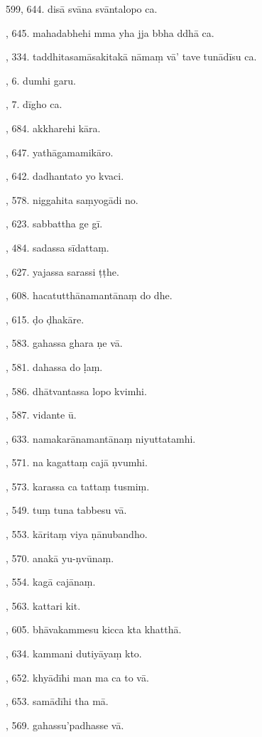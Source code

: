 599, 644. disā svāna svāntalopo ca.\par {}, 645. mahadabhehi mma yha jja bbha ddhā ca.\par {}, 334. taddhitasamāsakitakā nāmaṃ vā’ tave tunādīsu ca.\par {}, 6. dumhi garu.\par {}, 7. dīgho ca.\par {}, 684. akkharehi kāra.\par {}, 647. yathāgamamikāro.\par {}, 642. dadhantato yo kvaci.\par {}, 578. niggahita saṃyogādi no.\par {}, 623. sabbattha ge gī.\par {}, 484. sadassa sīdattaṃ.\par {}, 627. yajassa sarassi ṭṭhe.\par {}, 608. hacatutthānamantānaṃ do dhe.\par {}, 615. ḍo ḍhakāre.\par {}, 583. gahassa ghara ṇe vā.\par {}, 581. dahassa do ḷaṃ.\par {}, 586. dhātvantassa lopo kvimhi.\par {}, 587. vidante ū.\par {}, 633. namakarānamantānaṃ niyuttatamhi.\par {}, 571. na kagattaṃ cajā ṇvumhi.\par {}, 573. karassa ca tattaṃ tusmiṃ.\par {}, 549. tuṃ tuna tabbesu vā.\par {}, 553. kāritaṃ viya ṇānubandho.\par {}, 570. anakā yu-ṇvūnaṃ.\par {}, 554. kagā cajānaṃ.\par {}, 563. kattari kit.\par {}, 605. bhāvakammesu kicca kta khatthā.\par {}, 634. kammani dutiyāyaṃ kto.\par {}, 652. khyādīhi man ma ca to vā.\par {}, 653. samādīhi tha mā.\par {}, 569. gahassu’padhasse vā.\par \noindent
